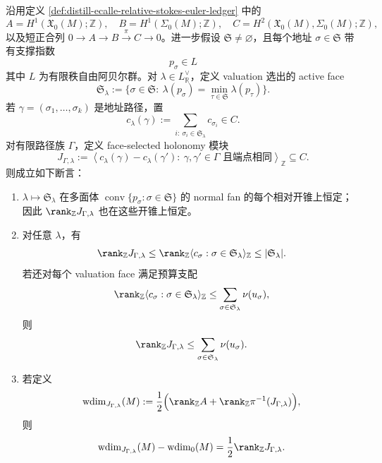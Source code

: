 \begin{proposition}\label{prop:distill-khovanskii-valuation-stokes-face-rank-audit}
沿用定义 \ref{def:distill-ecalle-relative-stokes-euler-ledger} 中的
\[
A=H^1(\mathfrak X_0(M);\mathbb Z),\quad
B=H^1(\Sigma_0(M);\mathbb Z),\quad
C=H^2(\mathfrak X_0(M),\Sigma_0(M);\mathbb Z),
\]
以及短正合列 \(0\to A\to B\xrightarrow{\pi}C\to0\)。进一步假设 \(\mathfrak S\ne\varnothing\)，且每个地址 \(\sigma\in\mathfrak S\) 带有支撑指数
\[
p_\sigma\in L
\]
其中 \(L\) 为有限秩自由阿贝尔群。对 \(\lambda\in L_\mathbb R^\vee\)，定义 valuation 选出的 active face
\[
\mathfrak S_\lambda:=\{\sigma\in\mathfrak S:\ \lambda(p_\sigma)=\min_{\tau\in\mathfrak S}\lambda(p_\tau)\}.
\]
若 \(\gamma=(\sigma_1,\ldots,\sigma_k)\) 是地址路径，置
\[
c_\lambda(\gamma):=\sum_{i:\ \sigma_i\in\mathfrak S_\lambda}c_{\sigma_i}\in C.
\]
对有限路径族 \(\Gamma\)，定义 face-selected holonomy 模块
\[
J_{\Gamma,\lambda}:=\left\langle c_\lambda(\gamma)-c_\lambda(\gamma'):\
\gamma,\gamma'\in\Gamma\text{ 且端点相同}\right\rangle_{\mathbb Z}\subseteq C.
\]
则成立如下断言：
\begin{enumerate}
  \item \(\lambda\mapsto \mathfrak S_\lambda\) 在多面体 \(\operatorname{conv}\{p_\sigma:\sigma\in\mathfrak S\}\) 的 normal fan 的每个相对开锥上恒定；因此 \(\rank_{\mathbb Z}J_{\Gamma,\lambda}\) 也在这些开锥上恒定。
  \item 对任意 \(\lambda\)，有
  \[
  \rank_{\mathbb Z}J_{\Gamma,\lambda}
  \le
  \rank_{\mathbb Z}\langle c_\sigma:\sigma\in\mathfrak S_\lambda\rangle_{\mathbb Z}
  \le |\mathfrak S_\lambda|.
  \]
  若还对每个 valuation face 满足预算支配
  \[
  \rank_{\mathbb Z}\langle c_\sigma:\sigma\in\mathfrak S_\lambda\rangle_{\mathbb Z}
  \le \sum_{\sigma\in\mathfrak S_\lambda}\nu(u_\sigma),
  \]
  则
  \[
  \rank_{\mathbb Z}J_{\Gamma,\lambda}
  \le \sum_{\sigma\in\mathfrak S_\lambda}\nu(u_\sigma).
  \]
  \item 若定义
  \[
  \mathrm{wdim}_{J_{\Gamma,\lambda}}(M)
  :=\frac12\Bigl(\rank_{\mathbb Z}A+\rank_{\mathbb Z}\pi^{-1}(J_{\Gamma,\lambda})\Bigr),
  \]
  则
  \[
  \mathrm{wdim}_{J_{\Gamma,\lambda}}(M)-\mathrm{wdim}_{0}(M)
  =\frac12\rank_{\mathbb Z}J_{\Gamma,\lambda}.
  \]
\end{enumerate}
\end{proposition}
